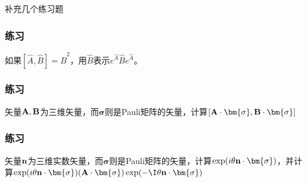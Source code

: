 补充几个练习题

\subsubsection{练习}
如果$[\hat A,\hat B]=\hat B^2$，用$\hat B$表示$e^{\hat A}\hat Be^{\hat A}$。


\subsubsection{练习}
矢量$\bf A, B$为三维矢量，而$\bm{\sigma}$则是Pauli矩阵的矢量，计算$[\bf A\cdot\bm{\sigma},B\cdot\bm{\sigma}]$


\subsubsection{练习}
矢量$\bf n$为三维实数矢量，而$\bm{\sigma}$则是Pauli矩阵的矢量，计算$\exp(i\theta\bf n\cdot\bm{\sigma})$，并计算$\exp(i\theta\bf n\cdot\bm{\sigma})(\bf A\cdot\bm{\sigma})\exp(-\I\theta\bf n\cdot\bm{\sigma})$
